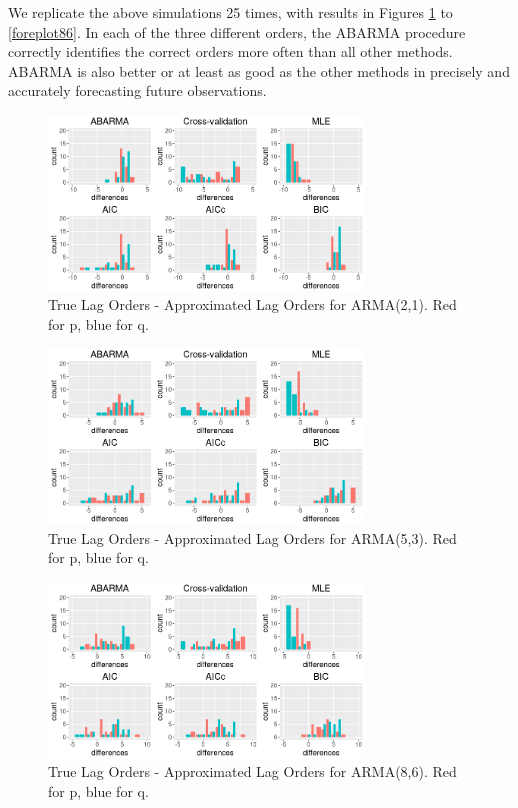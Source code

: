 We replicate the above simulations 25 times, with results in Figures \ref{lagplot21} to \ref{foreplot86}. In each of the three different orders, the ABARMA procedure correctly identifies the correct orders more often than all other methods. ABARMA is also better or at least as good as the other methods in precisely and accurately forecasting future observations.

\begin{figure}
    \centering
    \includegraphics[width=3.3in]{truelag-approxlag21.png}
    \caption{True Lag Orders - Approximated Lag Orders for ARMA(2,1). Red for p, blue for q.}
    \label{lagplot21}
\end{figure}

\begin{figure}
    \centering
    \includegraphics[width=3.3in]{truelag-approxlag53.png}
    \caption{True Lag Orders - Approximated Lag Orders for ARMA(5,3). Red for p, blue for q.}
    \label{lagplot53}
\end{figure}

\begin{figure}
    \centering
    \includegraphics[width=3.3in]{truelag-approxlag86.png}
    \caption{True Lag Orders - Approximated Lag Orders for ARMA(8,6). Red for p, blue for q.}
    \label{lagplot86}
\end{figure}

